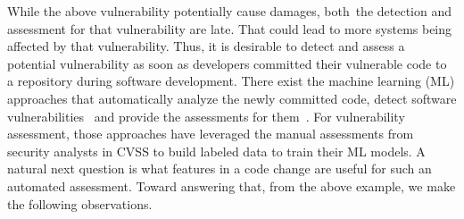 While the above vulnerability potentially cause damages, both~the
detection and assessment for that vulnerability are late. That could
lead to more systems being affected by that vulnerability. Thus, it is
desirable to detect and assess a potential vulnerability as soon as
developers committed their vulnerable code to a repository during
software development. There exist the machine learning (ML) approaches
that automatically analyze the newly committed code, detect software
vulnerabilities~\cite{perl2015vccfinder,zhou2017automated,chen2019large}
and provide the assessments for them~\cite{deepCVA-ase21}. For
vulnerability assessment, those approaches have leveraged the manual
assessments from security analysts in CVSS to build labeled data to
train their ML models.
A natural next question is what features in a code change are useful
for such an automated assessment. Toward answering that, from the
above example, we make the following observations.


